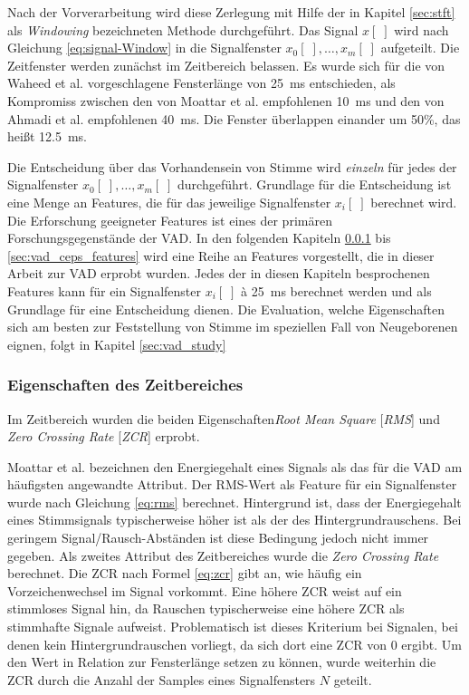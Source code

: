 Nach der Vorverarbeitung wird diese Zerlegung mit Hilfe der in Kapitel \ref{sec:stft} als \emph{Windowing} bezeichneten Methode durchgeführt. Das Signal $x[\;]$ wird nach Gleichung \ref{eq:signal-Window} in die Signalfenster $x_0[\;] , \ldots , x_m[\;]$ aufgeteilt. Die Zeitfenster werden zunächst im Zeitbereich belassen. Es wurde sich für die von Waheed et al. \cite{vad_entropy} vorgeschlagene Fensterlänge von \SI{25}{\milli\second} entschieden, als Kompromiss zwischen den von Moattar et al. \cite{vad_Easy} empfohlenen \SI{10}{\milli\second} und den von Ahmadi et al. \cite{vad_ceps} empfohlenen \SI{40}{\milli\second}. Die Fenster überlappen einander um 50\%, das heißt \SI{12.5}{\milli\second}.

Die Entscheidung über das Vorhandensein von Stimme wird \emph{einzeln} für jedes der Signalfenster $x_0[\;] , \ldots , x_m[\;]$ durchgeführt. Grundlage für die Entscheidung ist eine Menge an Features, die für das jeweilige Signalfenster $x_i[\;]$ berechnet wird. Die Erforschung geeigneter Features ist eines der primären Forschungsgegenstände der VAD. In den folgenden Kapiteln \ref{sec:vad_time_features} bis \ref{sec:vad_ceps_features} wird eine Reihe an Features vorgestellt, die in dieser Arbeit zur VAD erprobt wurden. Jedes der in diesen Kapiteln besprochenen Features kann für ein Signalfenster $x_i[\;]$ \`{a} \SI{25}{\milli\second} berechnet werden und als Grundlage für eine Entscheidung dienen. Die Evaluation, welche Eigenschaften sich am besten zur Feststellung von Stimme im speziellen Fall von Neugeborenen eignen, folgt in Kapitel \ref{sec:vad_study}

\subsubsection{Eigenschaften des Zeitbereiches}
\label{sec:vad_time_features}

Im Zeitbereich wurden die beiden Eigenschaften\emph{Root Mean Square} [\emph{RMS}] und \emph{Zero Crossing Rate} [\emph{ZCR}] erprobt.

Moattar et al. \cite{vad_Easy} bezeichnen den Energiegehalt eines Signals als das für die VAD am häufigsten angewandte Attribut. Der RMS-Wert als Feature für ein Signalfenster wurde nach Gleichung \ref{eq:rms} berechnet. Hintergrund ist, dass der Energiegehalt eines Stimmsignals typischerweise höher ist als der des Hintergrundrauschens. Bei geringem Signal/Rausch-Abständen ist diese Bedingung jedoch nicht immer gegeben. Als zweites Attribut des Zeitbereiches wurde die \emph{Zero Crossing Rate} berechnet. Die ZCR nach Formel \ref{eq:zcr} gibt an, wie häufig ein Vorzeichenwechsel im Signal vorkommt. Eine höhere ZCR weist auf ein stimmloses Signal hin, da Rauschen typischerweise eine höhere ZCR als stimmhafte Signale aufweist. Problematisch ist dieses Kriterium bei Signalen, bei denen kein Hintergrundrauschen vorliegt, da sich dort eine ZCR von 0 ergibt.\cite{vad_ceps} Um den Wert in Relation zur Fensterlänge setzen zu können, wurde weiterhin die ZCR durch die Anzahl der Samples eines Signalfensters $N$ geteilt.

